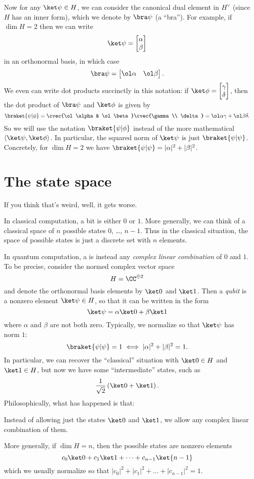 Now for any $\ket\psi \in H$,
we can consider the canonical dual element in $H^\vee$
(since $H$ has an inner form), which we denote by $\bra\psi$ (a ``bra'').
For example, if $\dim H = 2$ then we can write
\[ \ket\psi = \begin{bmatrix} \alpha \\ \beta \end{bmatrix} \]
in an orthonormal basis, in which case
\[ \bra\psi = \begin{bmatrix} \ol\alpha & \ol\beta \end{bmatrix}. \]
We even can write dot products succinctly in this notation:
if $\ket\phi = \begin{bmatrix} \gamma \\ \delta \end{bmatrix}$,
then the dot product of $\bra\psi$ and $\ket\phi$ is given by
\[
	\braket{\psi|\phi}
	= \cvec{\ol\alpha & \ol\beta} \cvec{\gamma \\ \delta}
	= \ol\alpha\gamma + \ol\beta \delta.
\]
So we will use the notation $\braket{\psi|\phi}$
instead of the more mathematical $\left< \ket\psi, \ket\phi \right>$.
In particular, the squared norm of $\ket\psi$ is just $\braket{\psi|\psi}$.
Concretely, for $\dim H = 2$ we have
$\braket{\psi|\psi} = |\alpha|^2 + |\beta|^2$.

\section{The state space}
If you think that's weird, well, it gets worse.

In classical computation, a bit is either $0$ or $1$.
More generally, we can think of a classical space of $n$
possible states $0$, \dots, $n-1$.
Thus in the classical situation, the space of possible states
is just a discrete set with $n$ elements.

In quantum computation, a  is instead
any \emph{complex linear combination} of $0$ and $1$.
To be precise, consider the normed complex vector space
\[ H = \CC^{\oplus 2} \]
and denote the orthonormal basis elements by $\ket0$ and $\ket1$.
Then a \emph{qubit} is a nonzero element $\ket\psi \in H$,
so that it can be written in the form
\[ \ket\psi = \alpha \ket 0 + \beta \ket 1 \]
where $\alpha$ and $\beta$ are not both zero.
Typically, we normalize so that $\ket\psi$ has norm $1$:
\[ \braket{\psi|\psi} = 1 \iff |\alpha|^2 + |\beta|^2 = 1. \]
In particular, we can recover the ``classical'' situation
with $\ket 0 \in H$ and $\ket 1 \in H$,
but now we have some ``intermediate'' states,
such as \[ \frac{1}{\sqrt2} \left(\ket 0 + \ket 1 \right). \]
Philosophically, what has happened is that:
\begin{moral}
	Instead of allowing just the states $\ket 0$ and $\ket 1$,
	we allow any complex linear combination of them.
\end{moral}
More generally, if $\dim H = n$,
then the possible states are nonzero elements
\[ c_0\ket0 + c_1\ket1 + \dots + c_{n-1}\ket{n-1} \]
which we usually normalize so that
$|c_0|^2 + |c_1|^2 + \dots + |c_{n-1}|^2 = 1$.

